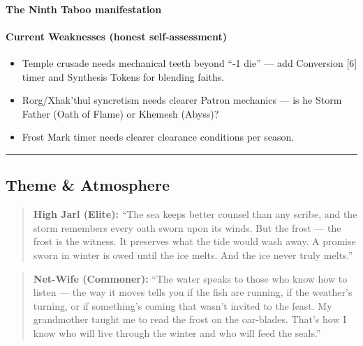 \paragraph{The Ninth Taboo manifestation}

\paragraph{Current Weaknesses (honest self-assessment)}
\begin{itemize}
\item Temple crusade needs mechanical teeth beyond ``-1 die'' --- add Conversion [6] timer and Synthesis Tokens for blending faiths.
\item Rorg/Xhak'thul syncretism needs clearer Patron mechanics --- is he Storm Father (Oath of Flame) or Khemesh (Abyss)?
\item Frost Mark timer needs clearer clearance conditions per season.
\end{itemize}

\vspace{1cm}
\hrule
\vspace{0.5cm}

\subsection*{Theme \& Atmosphere}

\begin{quote}
  \textbf{High Jarl (Elite):}  
  ``The sea keeps better counsel than any scribe, and the storm remembers every oath sworn upon its winds. But the frost --- the frost is the witness. It preserves what the tide would wash away. A promise sworn in winter is owed until the ice melts. And the ice never truly melts.''
\end{quote}

\begin{quote}
  \textbf{Net-Wife (Commoner):}  
  ``The water speaks to those who know how to listen --- the way it moves tells you if the fish are running, if the weather's turning, or if something's coming that wasn't invited to the feast. My grandmother taught me to read the frost on the oar-blades. That's how I know who will live through the winter and who will feed the seals.''
\end{quote}

